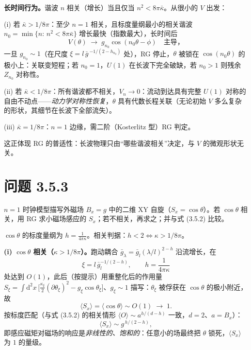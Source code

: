 \textbf{长时间行为。}谐波 $n$ 相关（增长）当且仅当 $n^{2}<8\pi\bar\kappa$。从很小的 $V$ 出发：

(i) 若 $\bar\kappa>1/8\pi$：至少 $n=1$ 相关，且标度量纲最小的相关谐波 $n_0=\min\{n:\,n^{2}<8\pi\bar\kappa\}$ 增长最快（指数最大），长时间后
\begin{equation*}
V(\theta)\;\longrightarrow\;g_{n_0}\cos(n_0\theta-\phi)\quad\text{主导}，
\end{equation*}
一旦 $g_{n_0}\sim1$（在尺度 $\xi=l\,\bar g\,^{-1/(2-h_{n_0})}$ 处），RG 停止，$\theta$ 被锁在 $\cos(n_0\theta)$ 的极小上：关联变短程；若 $n_0=1$，$U(1)$ 在长波下完全破缺，若 $n_0>1$ 则残余 $Z_{n_0}$ 对称性。

(ii) 若 $\bar\kappa<1/8\pi$：所有谐波都不相关，$V_n\to0$：流动到达具有完整 $U(1)$ 对称的自由不动点——\emph{动力学对称性恢复}，$\theta$ 具有代数长程关联（无论初始 $V$ 多么复杂的形状，其细节在长波下全部流失）。

(iii) $\bar\kappa=1/8\pi$：$n=1$ 边缘，需二阶（Kosterlitz 型）RG 判定。

这正体现 RG 的普适性：长波物理只由“哪些谐波相关”决定，与 $V$ 的微观形状无关。

\section*{问题 3.5.3}
\begin{problem}
$n=1$ 时钟模型描写外磁场 $B_x=g$ 中的二维 XY 自旋（$S_x=\cos\theta$）。若 $\cos\theta$ 相关，用 RG 求小磁场感应的 $S_x$；若不相关，再求之；并与式 (3.5.2) 比较。
\end{problem}
\solution

$\cos\theta$ 的标度量纲为 $h=\frac{1}{4\pi\kappa}$。相关判据：$h<2\Leftrightarrow\kappa>1/8\pi$。

\textbf{(i) $\cos\theta$ 相关（$\kappa>1/8\pi$）。}跑动耦合 $\bar g_\lambda=\bar g_l(\lambda/l)^{2-h}$ 沿流增长，在
\begin{equation*}
\xi=l\,\bar g_l^{-1/(2-h)},\qquad h=\frac{1}{4\pi\kappa}
\end{equation*}
处达到 $O(1)$，此后（按提示）用重整化后的作用量 $S_\xi=\int\mathrm{d}^{2}x\,\big[\frac{\kappa_\xi}{2}(\partial\theta_\xi)^{2}-g_\xi\cos\theta_\xi\big]$、$g_\xi\sim1$ 描写：$\theta_\xi$ 被俘获在 $\cos\theta$ 的极小附近，故
\begin{equation*}
\langle S_x\rangle=\langle\cos\theta\rangle\sim O(1)\;\longrightarrow\;1 .
\end{equation*}
按标度匹配（与式 (3.5.2) 的相关情形 $\langle O\rangle\sim a^{h/(d-h)}$ 一致，$d=2$、$a=B_x$）：
\begin{equation*}
\langle S_x\rangle\sim g^{\,h/(2-h)} ,
\end{equation*}
即感应磁矩对磁场的响应是\emph{非线性的、饱和的}：任意小的场最终把 $\theta$ 锁死，$\langle S_x\rangle$ 为 $1$ 的量级。

